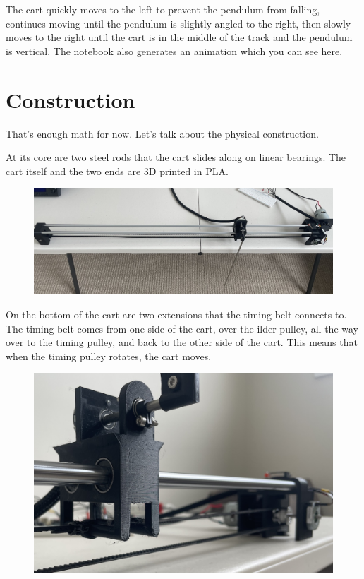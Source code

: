 \documentclass{article}
\begin{document}
The cart quickly moves to the left to prevent the pendulum from falling, continues moving until the pendulum is slightly angled to the right, then slowly moves to the right until the cart is in the middle of the track and the pendulum is vertical. The notebook also generates an animation which you can see \href{https://github.com/chrisdoble/self-balancing-inverted-pendulum/blob/master/post/images/controlled.gif}{here}.

\section{Construction}

That's enough math for now. Let's talk about the physical construction.

At its core are two steel rods that the cart slides along on linear bearings. The cart itself and the two ends are 3D printed in PLA.

\begin{figure}[H]
  \centering
  \includegraphics[width=\textwidth]{construction_1}
\end{figure}

On the bottom of the cart are two extensions that the timing belt connects to. The timing belt comes from one side of the cart, over the ilder pulley, all the way over to the timing pulley, and back to the other side of the cart. This means that when the timing pulley rotates, the cart moves.

\begin{figure}[H]
  \centering
  \includegraphics[width=0.5 \textwidth]{construction_2}
\end{figure}
\end{document}
